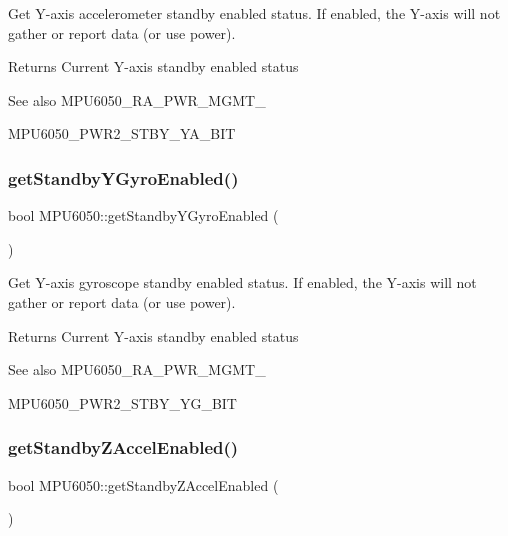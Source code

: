 Get Y-\/axis accelerometer standby enabled status. If enabled, the Y-\/axis will not gather or report data (or use power). \begin{DoxyReturn}{Returns}
Current Y-\/axis standby enabled status 
\end{DoxyReturn}
\begin{DoxySeeAlso}{See also}
M\+P\+U6050\+\_\+\+R\+A\+\_\+\+P\+W\+R\+\_\+\+M\+G\+M\+T\+\_ 

M\+P\+U6050\+\_\+\+P\+W\+R2\+\_\+\+S\+T\+B\+Y\+\_\+\+Y\+A\+\_\+\+B\+IT 
\end{DoxySeeAlso}
\mbox{\label{class_m_p_u6050_aaad2985f8d22aec123f1e1dabcdd427a}} 
\subsubsection{\texorpdfstring{getStandbyYGyroEnabled()}{getStandbyYGyroEnabled()}}
{\footnotesize\ttfamily bool M\+P\+U6050\+::get\+Standby\+Y\+Gyro\+Enabled (\begin{DoxyParamCaption}{ }\end{DoxyParamCaption})}

Get Y-\/axis gyroscope standby enabled status. If enabled, the Y-\/axis will not gather or report data (or use power). \begin{DoxyReturn}{Returns}
Current Y-\/axis standby enabled status 
\end{DoxyReturn}
\begin{DoxySeeAlso}{See also}
M\+P\+U6050\+\_\+\+R\+A\+\_\+\+P\+W\+R\+\_\+\+M\+G\+M\+T\+\_ 

M\+P\+U6050\+\_\+\+P\+W\+R2\+\_\+\+S\+T\+B\+Y\+\_\+\+Y\+G\+\_\+\+B\+IT 
\end{DoxySeeAlso}
\mbox{\label{class_m_p_u6050_adae85612e047c4c7f0c3b7110fc92956}} 
\subsubsection{\texorpdfstring{getStandbyZAccelEnabled()}{getStandbyZAccelEnabled()}}
{\footnotesize\ttfamily bool M\+P\+U6050\+::get\+Standby\+Z\+Accel\+Enabled (\begin{DoxyParamCaption}{ }\end{DoxyParamCaption})}

